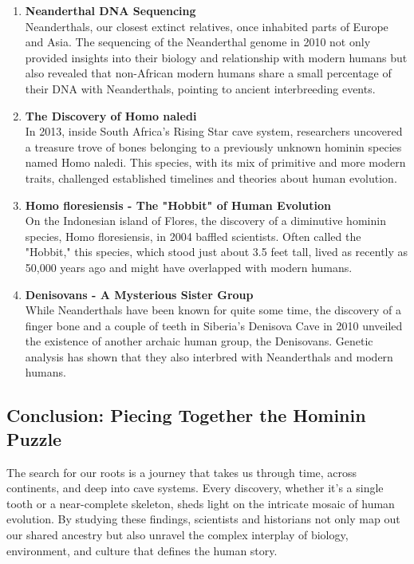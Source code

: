 \documentclass[a4paper,12pt]{book}
\begin{document}
\begin{enumerate}
    \item \textbf{Neanderthal DNA Sequencing} \\
    Neanderthals, our closest extinct relatives, once inhabited parts of Europe and Asia. The sequencing of the Neanderthal genome in 2010 not only provided insights into their biology and relationship with modern humans but also revealed that non-African modern humans share a small percentage of their DNA with Neanderthals, pointing to ancient interbreeding events.

    \item \textbf{The Discovery of Homo naledi} \\
    In 2013, inside South Africa's Rising Star cave system, researchers uncovered a treasure trove of bones belonging to a previously unknown hominin species named Homo naledi. This species, with its mix of primitive and more modern traits, challenged established timelines and theories about human evolution.

    \item \textbf{Homo floresiensis - The "Hobbit" of Human Evolution} \\
    On the Indonesian island of Flores, the discovery of a diminutive hominin species, Homo floresiensis, in 2004 baffled scientists. Often called the "Hobbit," this species, which stood just about 3.5 feet tall, lived as recently as 50,000 years ago and might have overlapped with modern humans.

    \item \textbf{Denisovans - A Mysterious Sister Group} \\
    While Neanderthals have been known for quite some time, the discovery of a finger bone and a couple of teeth in Siberia's Denisova Cave in 2010 unveiled the existence of another archaic human group, the Denisovans. Genetic analysis has shown that they also interbred with Neanderthals and modern humans.
\end{enumerate}

\subsection*{Conclusion: Piecing Together the Hominin Puzzle}
The search for our roots is a journey that takes us through time, across continents, and deep into cave systems. Every discovery, whether it's a single tooth or a near-complete skeleton, sheds light on the intricate mosaic of human evolution. By studying these findings, scientists and historians not only map out our shared ancestry but also unravel the complex interplay of biology, environment, and culture that defines the human story.
\end{document}
